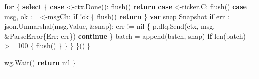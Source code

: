 \documentclass[
]{article}
\newenvironment{Shaded}{}{}
\newcommand{\BuiltInTok}[1]{\textcolor[rgb]{0.00,0.50,0.00}{#1}}
\newcommand{\ControlFlowTok}[1]{\textcolor[rgb]{0.00,0.44,0.13}{\textbf{#1}}}
\newcommand{\DecValTok}[1]{\textcolor[rgb]{0.25,0.63,0.44}{#1}}
\newcommand{\KeywordTok}[1]{\textcolor[rgb]{0.00,0.44,0.13}{\textbf{#1}}}
\newcommand{\NormalTok}[1]{#1}
\newcommand{\OperatorTok}[1]{\textcolor[rgb]{0.40,0.40,0.40}{#1}}
\newcommand{\OtherTok}[1]{\textcolor[rgb]{0.00,0.44,0.13}{#1}}
\begin{document}
\begin{Shaded}
\begin{Highlighting}[]
            \ControlFlowTok{for} \OperatorTok{\{}
                \ControlFlowTok{select} \OperatorTok{\{}
                \ControlFlowTok{case} \OperatorTok{\textless{}{-}}\NormalTok{ctx}\OperatorTok{.}\NormalTok{Done}\OperatorTok{():}
\NormalTok{                    flush}\OperatorTok{()}
                    \ControlFlowTok{return}
                \ControlFlowTok{case} \OperatorTok{\textless{}{-}}\NormalTok{ticker}\OperatorTok{.}\NormalTok{C}\OperatorTok{:}
\NormalTok{                    flush}\OperatorTok{()}
                \ControlFlowTok{case}\NormalTok{ msg}\OperatorTok{,}\NormalTok{ ok }\OperatorTok{:=} \OperatorTok{\textless{}{-}}\NormalTok{msgCh}\OperatorTok{:}
                    \ControlFlowTok{if} \OperatorTok{!}\NormalTok{ok }\OperatorTok{\{}
\NormalTok{                        flush}\OperatorTok{()}
                        \ControlFlowTok{return}
                    \OperatorTok{\}}
                    \KeywordTok{var}\NormalTok{ snap Snapshot}
                    \ControlFlowTok{if}\NormalTok{ err }\OperatorTok{:=}\NormalTok{ json}\OperatorTok{.}\NormalTok{Unmarshal}\OperatorTok{(}\NormalTok{msg}\OperatorTok{.}\NormalTok{Value}\OperatorTok{,} \OperatorTok{\&}\NormalTok{snap}\OperatorTok{);}\NormalTok{ err }\OperatorTok{!=} \OtherTok{nil} \OperatorTok{\{}
\NormalTok{                        p}\OperatorTok{.}\NormalTok{dlq}\OperatorTok{.}\NormalTok{Send}\OperatorTok{(}\NormalTok{ctx}\OperatorTok{,}\NormalTok{ msg}\OperatorTok{,} \OperatorTok{\&}\NormalTok{ParseError}\OperatorTok{\{}\NormalTok{Err}\OperatorTok{:}\NormalTok{ err}\OperatorTok{\})}
                        \ControlFlowTok{continue}
                    \OperatorTok{\}}
\NormalTok{                    batch }\OperatorTok{=} \BuiltInTok{append}\OperatorTok{(}\NormalTok{batch}\OperatorTok{,}\NormalTok{ snap}\OperatorTok{)}
                    \ControlFlowTok{if} \BuiltInTok{len}\OperatorTok{(}\NormalTok{batch}\OperatorTok{)} \OperatorTok{\textgreater{}=} \DecValTok{100} \OperatorTok{\{}
\NormalTok{                        flush}\OperatorTok{()}
                    \OperatorTok{\}}
                \OperatorTok{\}}
            \OperatorTok{\}}
        \OperatorTok{\}()}
    \OperatorTok{\}}

\NormalTok{    wg}\OperatorTok{.}\NormalTok{Wait}\OperatorTok{()}
    \ControlFlowTok{return} \OtherTok{nil}
\OperatorTok{\}}
\end{Highlighting}
\end{Shaded}

\begin{center}\rule{0.5\linewidth}{0.5pt}\end{center}
\end{document}
